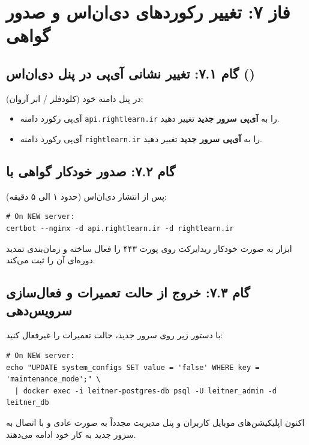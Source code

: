 \documentclass[11pt,a4paper]{article}
\begin{document}
\section{فاز ۷: تغییر رکوردهای دی‌ان‌اس و صدور گواهی }

\subsection{گام ۷.۱: تغییر نشانی آی‌پی در پنل دی‌ان‌اس ()}
در پنل دامنه خود (کلودفلر / ابر آروان):
\begin{itemize}
    \item آی‌پی رکورد  دامنه \verb|api.rightlearn.ir| را به \textbf{آی‌پی سرور جدید} تغییر دهید.
    \item آی‌پی رکورد  دامنه \verb|rightlearn.ir| را به \textbf{آی‌پی سرور جدید} تغییر دهید.
\end{itemize}

\subsection{گام ۷.۲: صدور خودکار گواهی  با }
پس از انتشار دی‌ان‌اس (حدود ۱ الی ۵ دقیقه):
\begin{latin}
\small
\begin{verbatim}
# On NEW server:
certbot --nginx -d api.rightlearn.ir -d rightlearn.ir
\end{verbatim}
\end{latin}
ابزار  به صورت خودکار ریدایرکت  روی پورت ۴۴۳ را فعال ساخته و زمان‌بندی تمدید دوره‌ای آن را ثبت می‌کند.

\subsection{گام ۷.۳: خروج از حالت تعمیرات و فعال‌سازی سرویس‌دهی}
با دستور زیر روی سرور جدید، حالت تعمیرات را غیرفعال کنید:
\begin{latin}
\small
\begin{verbatim}
# On NEW server:
echo "UPDATE system_configs SET value = 'false' WHERE key = 'maintenance_mode';" \
  | docker exec -i leitner-postgres-db psql -U leitner_admin -d leitner_db
\end{verbatim}
\end{latin}
اکنون اپلیکیشن‌های موبایل کاربران و پنل مدیریت مجدداً به صورت عادی و با اتصال به سرور جدید به کار خود ادامه می‌دهند.
\end{document}
